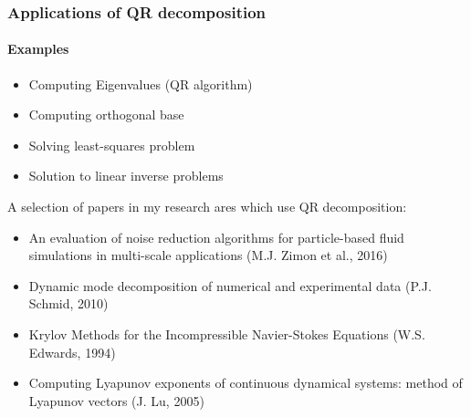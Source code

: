 \begin{frame}
\frametitle{Applications of QR decomposition}
\framesubtitle{Examples}
\begin{itemize}
 \item Computing Eigenvalues (QR algorithm)
 \item Computing orthogonal base 
 \item Solving least-squares problem
 \item Solution to linear inverse problems
\end{itemize}
A selection of papers in my research ares which use QR decomposition:
\begin{itemize}
 \item An evaluation of noise reduction algorithms for particle-based fluid simulations in multi-scale applications (M.J. Zimon et al., 2016)
 \item Dynamic mode decomposition of numerical and experimental data (P.J. Schmid, 2010)
 \item Krylov Methods for the Incompressible Navier-Stokes Equations (W.S. Edwards, 1994)
 \item Computing Lyapunov exponents of continuous dynamical systems: method of Lyapunov vectors (J. Lu, 2005)
\end{itemize}
\end{frame}

